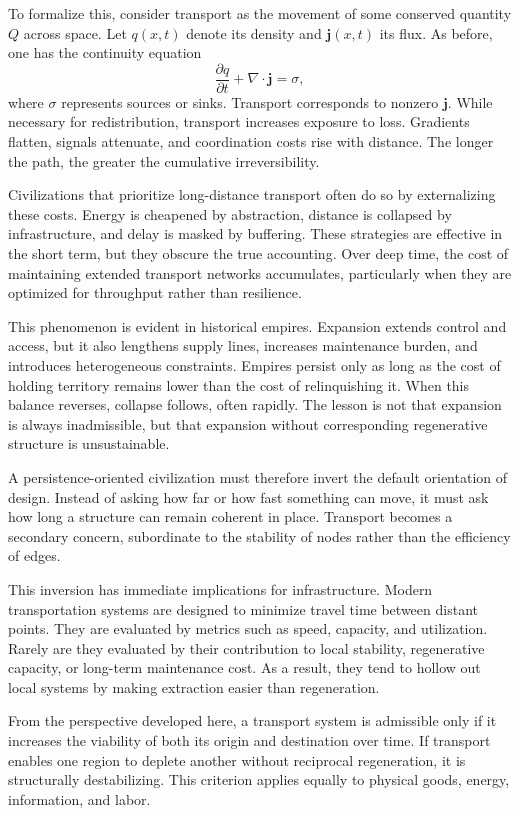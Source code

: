 \documentclass[12pt,oneside]{book}
\begin{document}
To formalize this, consider transport as the movement of some conserved quantity \(Q\) across space. Let \(q(x,t)\) denote its density and \(\mathbf{j}(x,t)\) its flux. As before, one has the continuity equation
\[
\frac{\partial q}{\partial t} + \nabla \cdot \mathbf{j} = \sigma,
\]
where \(\sigma\) represents sources or sinks. Transport corresponds to nonzero \(\mathbf{j}\). While necessary for redistribution, transport increases exposure to loss. Gradients flatten, signals attenuate, and coordination costs rise with distance. The longer the path, the greater the cumulative irreversibility.

Civilizations that prioritize long-distance transport often do so by externalizing these costs. Energy is cheapened by abstraction, distance is collapsed by infrastructure, and delay is masked by buffering. These strategies are effective in the short term, but they obscure the true accounting. Over deep time, the cost of maintaining extended transport networks accumulates, particularly when they are optimized for throughput rather than resilience.

This phenomenon is evident in historical empires. Expansion extends control and access, but it also lengthens supply lines, increases maintenance burden, and introduces heterogeneous constraints. Empires persist only as long as the cost of holding territory remains lower than the cost of relinquishing it. When this balance reverses, collapse follows, often rapidly. The lesson is not that expansion is always inadmissible, but that expansion without corresponding regenerative structure is unsustainable.

A persistence-oriented civilization must therefore invert the default orientation of design. Instead of asking how far or how fast something can move, it must ask how long a structure can remain coherent in place. Transport becomes a secondary concern, subordinate to the stability of nodes rather than the efficiency of edges.

This inversion has immediate implications for infrastructure. Modern transportation systems are designed to minimize travel time between distant points. They are evaluated by metrics such as speed, capacity, and utilization. Rarely are they evaluated by their contribution to local stability, regenerative capacity, or long-term maintenance cost. As a result, they tend to hollow out local systems by making extraction easier than regeneration.

From the perspective developed here, a transport system is admissible only if it increases the viability of both its origin and destination over time. If transport enables one region to deplete another without reciprocal regeneration, it is structurally destabilizing. This criterion applies equally to physical goods, energy, information, and labor.
\end{document}
